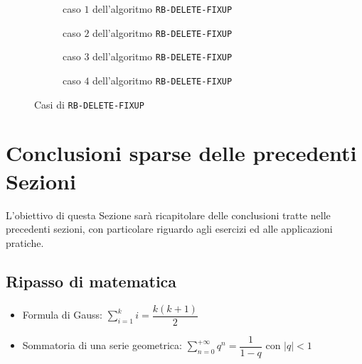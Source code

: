 \documentclass[italian, 10pt]{article}
\begin{document}
\begin{figure}[htbp]
  \begin{subfigure}{0.99\textwidth}
    \centering
    \bigskip
    \caption{caso \(1\) dell'algoritmo \texttt{RB-DELETE-FIXUP}}
    \label{fig:caso-1-algoritmo-rb-delete-fixup}
    \bigskip
  \end{subfigure}
  \begin{subfigure}{0.99\textwidth}
    \centering
    \bigskip
    \caption{caso \(2\) dell'algoritmo \texttt{RB-DELETE-FIXUP}}
    \label{fig:caso-2-algoritmo-rb-delete-fixup}
    \bigskip
  \end{subfigure}
  \begin{subfigure}{0.99\textwidth}
    \centering
    \bigskip
    \caption{caso \(3\) dell'algoritmo \texttt{RB-DELETE-FIXUP}}
    \label{fig:caso-3-algoritmo-rb-delete-fixup}
    \bigskip
  \end{subfigure}
  \begin{subfigure}{0.99\textwidth}
    \centering
    \bigskip
    \caption{caso \(4\) dell'algoritmo \texttt{RB-DELETE-FIXUP}}
    \label{fig:caso-4-algoritmo-rb-delete-fixup}
    \bigskip
  \end{subfigure}

  \caption{Casi di \texttt{RB-DELETE-FIXUP}}
  \label{fig:casi-algoritmo-rb-delete-fixup}
\end{figure}

\clearpage

\section{Conclusioni sparse delle precedenti Sezioni}

L'obiettivo di questa Sezione sarà ricapitolare delle conclusioni tratte nelle precedenti sezioni, con particolare riguardo agli esercizi ed alle applicazioni pratiche.

\subsection{Ripasso di matematica}

\begin{itemize}
  \item Formula di Gauss: \(\displaystyle \sum_{i=1}^k i = \dfrac{k(k+1)}{2}\)
  \item Sommatoria di una serie geometrica: \(\displaystyle \sum_{n=0}^{+\infty} q^n = \dfrac{1}{1-q}\) con \(|q| < 1\)
\end{itemize}
\end{document}
